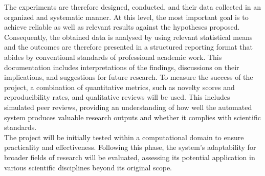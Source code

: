 The experiments are therefore designed, conducted, and their data collected in an organized and systematic manner. At this level, the most important goal is to achieve reliable as well as relevant results against the hypotheses proposed. Consequently, the obtained data is analysed by using relevant statistical means and the outcomes are therefore presented in a structured reporting format that abides by conventional standards of professional academic work. This documentation includes interpretations of the findings, discussions on their implications, and suggestions for future research. To measure the success of the project, a combination of quantitative metrics, such as novelty scores and reproducibility rates, and qualitative reviews will be used. This includes simulated peer reviews, providing an understanding of how well the automated system produces valuable research outputs and whether it complies with scientific standards. \\
The project will be initially tested within a computational domain to ensure practicality and effectiveness. Following this phase, the system's adaptability for broader fields of research will be evaluated, assessing its potential application in various scientific disciplines beyond its original scope.

